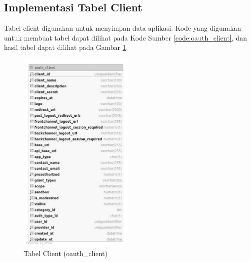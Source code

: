 \subsection{Implementasi Tabel Client}
\par Tabel client digunakan untuk menyimpan data aplikasi. Kode yang digunakan untuk membuat tabel dapat dilihat pada Kode Sumber \ref{code:oauth_client}, dan hasil tabel dapat dilihat pada Gambar \ref{tabel_oauth_client}.

\begin{figure}[H]
    \centering\includegraphics[width=0.5\textwidth]{bab4/figures/tabel_oauth_client.jpg}
    \caption{Tabel Client (oauth\_client)}
    \label{tabel_oauth_client}
\end{figure}

